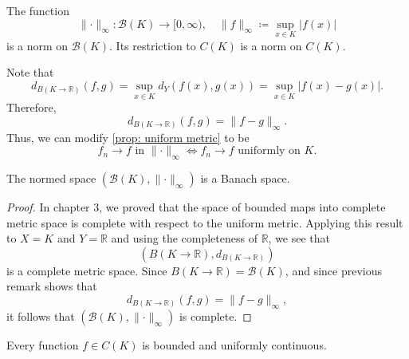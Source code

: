 \begin{proposition}
    The function 
    \[
        \lVert \cdot \rVert_\infty :\mathcal{B} (K) \to [0, \infty), \quad \lVert f \rVert_\infty \coloneqq \sup _{x \in K} \vert f(x) \vert
    \]
    is a norm on \(\mathcal{B} (K)\). Its restriction to \(C(K)\) is a norm on \(C(K)\).   
\end{proposition}

\begin{remark}
    Note that 
    \[
        d_{B(K \to \mathbb{R})}(f, g) = \sup_{x \in K} d_Y(f(x), g(x)) = \sup_{x \in K} \vert f(x) - g(x) \vert. 
    \]
    Therefore, 
    \[
        d_{B(K \to \mathbb{R})}(f, g) = \lVert f - g \rVert_\infty. 
    \]
    Thus, we can modify \autoref{prop: uniform metric} to be 
    \[
        f_n \to f \text{ in } \lVert \cdot \rVert_\infty \iff f_n \to f \text{ uniformly on } K.   
    \] 
\end{remark}

\begin{proposition}
    The normed space \((\mathcal{B} (K), \lVert \cdot \rVert_{\infty }) \) is a Banach space.
\end{proposition}
\begin{proof}
    In chapter 3, we proved that the space of bounded maps into complete metric space is complete with respect to the uniform metric. Applying this result to \(X = K\) and \(Y = \mathbb{R}\) and using the completeness of \(\mathbb{R}\), we see that 
    \[
        (B(K \to \mathbb{R}), d_{B(K \to \mathbb{R})})
    \]    
    is a complete metric space. Since \(B(K \to \mathbb{R}) = \mathcal{B} (K)\), and since previous remark shows that 
    \[
        d_{B(K \to \mathbb{R})}(f, g) = \lVert f - g \rVert_\infty, 
    \] 
    it follows that \((\mathcal{B}(K), \lVert \cdot \rVert_\infty )\) is complete.
\end{proof}

\begin{proposition}
    Every function \(f \in C(K)\) is bounded and uniformly continuous. 
\end{proposition}

